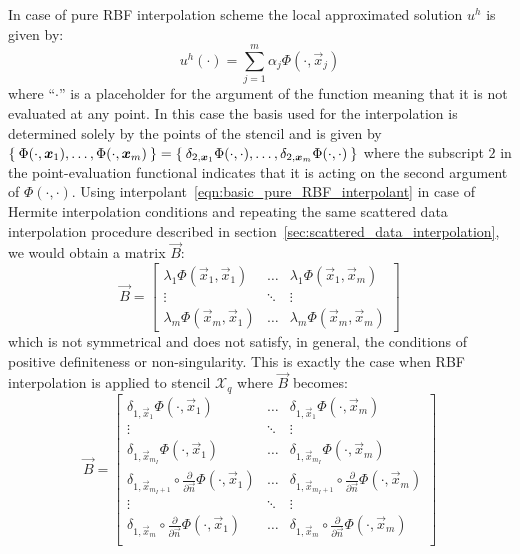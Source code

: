 \smallskip
In case of pure RBF interpolation scheme the local approximated solution $u^h$ is given by:
\begin{equation}
	\label{eqn:basic_pure_RBF_interpolant}
	u^h(\cdot) = \sum_{j=1}^{m} \alpha_j \Phi(\cdot,\vec{x}_j)
\end{equation}
where ``$\cdot$'' is a placeholder for the argument of the function meaning that it is not evaluated at any point. In this case the basis used for the interpolation is determined solely by the points of the stencil and is given by $\Set{\Phi(\cdot,\boldsymbol{x}_1), \dots, \Phi(\cdot,\boldsymbol{x}_m)} = \Set{\delta_{2,\boldsymbol{x}_1}\Phi(\cdot,\cdot), \dots, \delta_{2,\boldsymbol{x}_m}\Phi(\cdot,\cdot)}$ where the subscript $2$ in the point-evaluation functional indicates that it is acting on the second argument of $\Phi(\cdot, \cdot)$. Using interpolant~\eqref{eqn:basic_pure_RBF_interpolant} in case of Hermite interpolation conditions and repeating the same scattered data interpolation procedure described in section~\ref{sec:scattered_data_interpolation}, we would obtain a matrix $\vec{B}$:
\begin{equation}
	\label{eqn:unsymmetric_B}
	\vec{B} = 
	\begin{bmatrix}
		\lambda_1 \Phi(\vec{x}_1, \vec{x}_1)  &  \dots  & \lambda_1 \Phi(\vec{x}_1, \vec{x}_m)  \\
		\vdots								  & \ddots	& \vdots								 \\
		\lambda_m \Phi(\vec{x}_m, \vec{x}_1)  &  \dots  & \lambda_m \Phi(\vec{x}_m, \vec{x}_m)
	\end{bmatrix}
\end{equation}
which is not symmetrical and does not satisfy, in general, the conditions of positive definiteness or non-singularity. This is exactly the case when RBF interpolation is applied to stencil $\mathcal{X}_q$ where $\vec{B}$ becomes:
\begin{equation}
	\label{eqn:unsymmetric_B_RBF-FD}
	\vec{B} = 
	\begin{bmatrix}
		\delta_{1,\vec{x}_1} \Phi(\cdot, \vec{x}_1)  &  \dots  & \delta_{1,\vec{x}_1} \Phi(\cdot, \vec{x}_m)  			\\
		\vdots								  & \ddots	& \vdots								 						\\
		\delta_{1,\vec{x}_{m_I}} \Phi(\cdot, \vec{x}_1)  &  \dots  & \delta_{1,\vec{x}_{m_I}} \Phi(\cdot, \vec{x}_m)	\\
		\delta_{1,\vec{x}_{m_I+1}} \circ \frac{\partial}{\partial \vec{n}} \Phi(\cdot, \vec{x}_1)  &  \dots  & \delta_{1,\vec{x}_{m_I+1}} \circ \frac{\partial}{\partial \vec{n}} \Phi(\cdot, \vec{x}_m)	\\
		\vdots								  & \ddots	& \vdots								 						\\
		\delta_{1,\vec{x}_{m}} \circ \frac{\partial}{\partial \vec{n}} \Phi(\cdot, \vec{x}_1)  &  \dots  & \delta_{1,\vec{x}_{m}} \circ \frac{\partial}{\partial \vec{n}} \Phi(\cdot, \vec{x}_m)	\\
	\end{bmatrix}
\end{equation}

